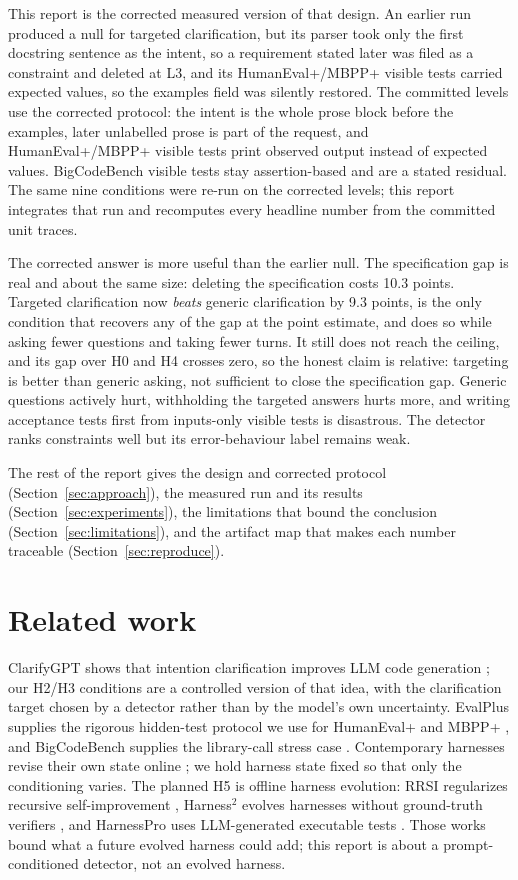 \documentclass{article}
\begin{document}
This report is the corrected measured version of that design. An earlier run produced a
null for targeted clarification, but its parser took only the first docstring sentence as the
intent, so a requirement stated later was filed as a constraint and deleted at L3, and its
HumanEval+/MBPP+ visible tests carried expected values, so the examples field was silently
restored. The committed levels use the corrected protocol: the intent is the whole prose block
before the examples, later unlabelled prose is part of the request, and HumanEval+/MBPP+
visible tests print observed output instead of expected values. BigCodeBench visible tests
stay assertion-based and are a stated residual. The same nine conditions were re-run on the
corrected levels; this report integrates that run and recomputes every headline number from
the committed unit traces.

The corrected answer is more useful than the earlier null. The specification gap is real and
about the same size: deleting the specification costs 10.3 points. Targeted clarification
now \emph{beats} generic clarification by 9.3 points, is the only condition that recovers any
of the gap at the point estimate, and does so while asking fewer questions and taking fewer
turns. It still does not reach the ceiling, and its gap over H0 and H4 crosses zero, so the
honest claim is relative: targeting is better than generic asking, not sufficient to close
the specification gap. Generic questions actively hurt, withholding the targeted answers
hurts more, and writing acceptance tests first from inputs-only visible tests is disastrous.
The detector ranks constraints well but its error-behaviour label remains weak.

The rest of the report gives the design and corrected protocol (Section~\ref{sec:approach}),
the measured run and its results (Section~\ref{sec:experiments}), the limitations that bound
the conclusion (Section~\ref{sec:limitations}), and the artifact map that makes each number
traceable (Section~\ref{sec:reproduce}).

\section{Related work}
\label{sec:related}

ClarifyGPT shows that intention clarification improves LLM code generation
\citep{mu2023clarifygpt}; our H2/H3 conditions are a controlled version of that idea, with the
clarification target chosen by a detector rather than by the model's own uncertainty. EvalPlus
supplies the rigorous hidden-test protocol we use for HumanEval+ and MBPP+
\citep{liu2023evalplus}, and BigCodeBench supplies the library-call stress case
\citep{zhuo2025bigcodebench}. Contemporary harnesses revise their own state online
\citep{xiao2026reharness}; we hold harness state fixed so that only the conditioning varies.
The planned H5 is offline harness evolution: RRSI regularizes recursive self-improvement
\citep{xia2026rrsi}, Harness$^2$ evolves harnesses without ground-truth verifiers
\citep{xu2026harness2}, and HarnessPro uses LLM-generated executable tests
\citep{pan2026harnesspro}. Those works bound what a future evolved harness could add; this
report is about a prompt-conditioned detector, not an evolved harness.
\end{document}
